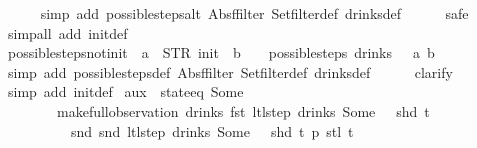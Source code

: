\begin{isabellebody}
%
\isadelimproof
\ \ \ \ %
\endisadelimproof
%
\isatagproof
{}\isamarkupfalse%
\ {\isacharparenleft}simp\ add{\isacharcolon}\ possible{\isacharunderscore}steps{\isacharunderscore}alt\ Abs{\isacharunderscore}ffilter\ Set{\isachardot}filter{\isacharunderscore}def\ drinks{\isacharunderscore}def{\isacharparenright}\isanewline
\ \ \ \ \isamarkupfalse%
\ safe\isanewline
\ \ \isamarkupfalse%
\ {\isacharparenleft}simp{\isacharunderscore}all\ add{\isacharcolon}\ init{\isacharunderscore}def{\isacharparenright}%
\endisatagproof
{\isafoldproof}%
%
\isadelimproof
\isanewline
%
\endisadelimproof
\isanewline
{}\isamarkupfalse%
\ possible{\isacharunderscore}steps{\isacharunderscore}not{\isacharunderscore}init{\isacharcolon}\ {\isachardoublequoteopen}{\isasymnot}\ {\isacharparenleft}a\ {\isacharequal}\ STR\ {\isacharprime}{\isacharprime}init{\isacharprime}{\isacharprime}\ {\isasymand}\ b\ {\isacharequal}\ {\isacharbrackleft}{\isacharbrackright}{\isacharparenright}\ {\isasymLongrightarrow}\ possible{\isacharunderscore}steps\ drinks\ {}\ {\isacharless}{\isachargreater}\ a\ b\ {\isacharequal}\ {\isacharbraceleft}{\isacharbar}{\isacharbar}{\isacharbraceright}{\isachardoublequoteclose}\isanewline
%
\isadelimproof
\ \ \ \ %
\endisadelimproof
%
\isatagproof
{}\isamarkupfalse%
\ {\isacharparenleft}simp\ add{\isacharcolon}\ possible{\isacharunderscore}steps{\isacharunderscore}def\ Abs{\isacharunderscore}ffilter\ Set{\isachardot}filter{\isacharunderscore}def\ drinks{\isacharunderscore}def{\isacharparenright}\isanewline
\ \ \ \ \isamarkupfalse%
\ clarify\isanewline
\ \ \ \ \isamarkupfalse%
\ {\isacharparenleft}simp\ add{\isacharcolon}\ init{\isacharunderscore}def{\isacharparenright}%
\endisatagproof
{\isafoldproof}%
%
\isadelimproof
\isanewline
%
\endisadelimproof
\isanewline
{}\isamarkupfalse%
\ aux{}{\isacharcolon}\ {\isachardoublequoteopen}{\isasymnot}\ state{\isacharunderscore}eq\ {\isacharparenleft}Some\ {}{\isacharparenright}\isanewline
\ \ \ \ \ \ \ \ {\isacharparenleft}make{\isacharunderscore}full{\isacharunderscore}observation\ drinks\ {\isacharparenleft}fst\ {\isacharparenleft}ltl{\isacharunderscore}step\ drinks\ {\isacharparenleft}Some\ {}{\isacharparenright}\ {\isacharless}{\isachargreater}\ {\isacharparenleft}shd\ t{\isacharparenright}{\isacharparenright}{\isacharparenright}\isanewline
\ \ \ \ \ \ \ \ \ \ {\isacharparenleft}snd\ {\isacharparenleft}snd\ {\isacharparenleft}ltl{\isacharunderscore}step\ drinks\ {\isacharparenleft}Some\ {}{\isacharparenright}\ {\isacharless}{\isachargreater}\ {\isacharparenleft}shd\ t{\isacharparenright}{\isacharparenright}{\isacharparenright}{\isacharparenright}\ p\ {\isacharparenleft}stl\ t{\isacharparenright}{\isacharparenright}{\isachardoublequoteclose}\isanewline

\end{isabellebody}
